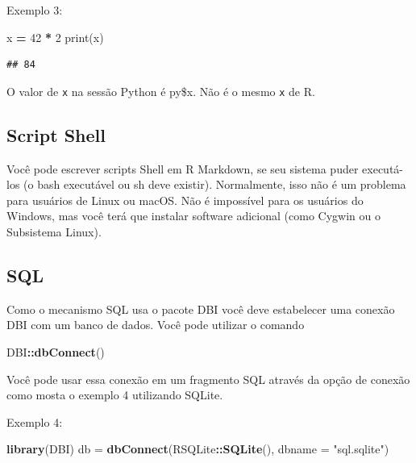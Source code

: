 \documentclass[
]{book}
\newenvironment{Shaded}{\begin{snugshade}}{\end{snugshade}}
\newcommand{\BuiltInTok}[1]{#1}
\newcommand{\DataTypeTok}[1]{\textcolor[rgb]{0.13,0.29,0.53}{#1}}
\newcommand{\DecValTok}[1]{\textcolor[rgb]{0.00,0.00,0.81}{#1}}
\newcommand{\KeywordTok}[1]{\textcolor[rgb]{0.13,0.29,0.53}{\textbf{#1}}}
\newcommand{\NormalTok}[1]{#1}
\newcommand{\OperatorTok}[1]{\textcolor[rgb]{0.81,0.36,0.00}{\textbf{#1}}}
\newcommand{\StringTok}[1]{\textcolor[rgb]{0.31,0.60,0.02}{#1}}
\begin{document}
Exemplo 3:

\begin{Shaded}
\begin{Highlighting}[]
\NormalTok{x }\OperatorTok{=} \DecValTok{42} \OperatorTok{*} \DecValTok{2}
\BuiltInTok{print}\NormalTok{(x)}
\end{Highlighting}
\end{Shaded}

\begin{verbatim}
## 84
\end{verbatim}

O valor de \texttt{x} na sessão Python é py\$x. Não é o mesmo \texttt{x} de R.

\hypertarget{script-shell}{%
\subsection{Script Shell}\label{script-shell}}

Você pode escrever scripts Shell em R Markdown, se seu sistema puder executá-los (o bash executável ou sh deve existir). Normalmente, isso não é um problema para usuários de Linux ou macOS. Não é impossível para os usuários do Windows, mas você terá que instalar software adicional (como Cygwin ou o Subsistema Linux).

\hypertarget{sql}{%
\subsection{SQL}\label{sql}}

Como o mecanismo SQL usa o pacote DBI você deve estabelecer uma conexão DBI com um banco de dados. Você pode utilizar o comando

\begin{Shaded}
\begin{Highlighting}[]
\NormalTok{DBI}\OperatorTok{::}\KeywordTok{dbConnect}\NormalTok{()}
\end{Highlighting}
\end{Shaded}

Você pode usar essa conexão em um fragmento SQL através da opção de conexão como mosta o exemplo 4 utilizando SQLite.

Exemplo 4:

\begin{Shaded}
\begin{Highlighting}[]
\KeywordTok{library}\NormalTok{(DBI)}
\NormalTok{db =}\StringTok{ }\KeywordTok{dbConnect}\NormalTok{(RSQLite}\OperatorTok{::}\KeywordTok{SQLite}\NormalTok{(), }\DataTypeTok{dbname =} \StringTok{"sql.sqlite"}\NormalTok{)}
\end{Highlighting}
\end{Shaded}
\end{document}

